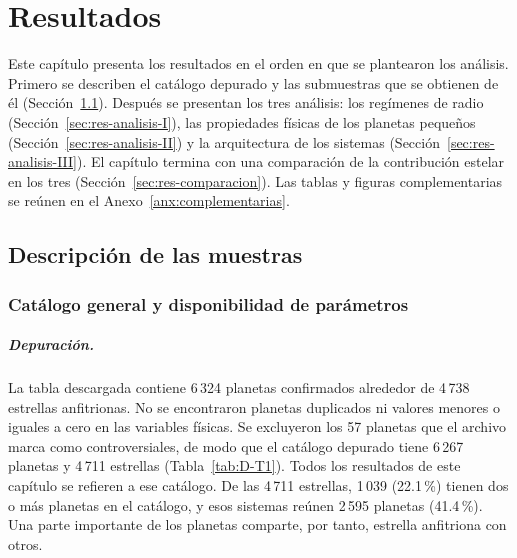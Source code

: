%
%
\providecommand{\rutatablas}{tablas/latex}
\providecommand{\rutafiguras}{figuras}

\chapter{Resultados}
\label{cap:resultados}

Este capítulo presenta los resultados en el orden en que se plantearon los análisis.
Primero se describen el catálogo depurado y las submuestras que se obtienen de él
(Sección~\ref{sec:res-muestras}). Después se presentan los tres análisis: los regímenes de
radio (Sección~\ref{sec:res-analisis-I}), las propiedades físicas de los planetas pequeños
(Sección~\ref{sec:res-analisis-II}) y la arquitectura de los sistemas
(Sección~\ref{sec:res-analisis-III}). El capítulo termina con una comparación de la
contribución estelar en los tres (Sección~\ref{sec:res-comparacion}). Las tablas y figuras
complementarias se reúnen en el Anexo~\ref{anx:complementarias}.

\section{Descripción de las muestras}
\label{sec:res-muestras}

\subsection{Catálogo general y disponibilidad de parámetros}
\label{sec:res-catalogo}

\paragraph{Depuración.}
La tabla descargada contiene 6\,324 planetas confirmados alrededor de 4\,738 estrellas
anfitrionas. No se encontraron planetas duplicados ni valores menores o iguales a cero en
las variables físicas. Se excluyeron los 57 planetas que el archivo marca como
controversiales, de modo que el catálogo depurado tiene 6\,267 planetas y 4\,711 estrellas
(Tabla~\ref{tab:D-T1}). Todos los resultados de este capítulo se refieren a ese catálogo.
De las 4\,711 estrellas, 1\,039 (22.1\,\%) tienen dos o más planetas en el catálogo, y esos
sistemas reúnen 2\,595 planetas (41.4\,\%). Una parte importante de los planetas comparte,
por tanto, estrella anfitriona con otros.

